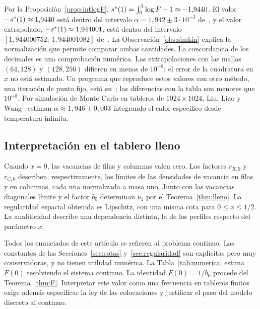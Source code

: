 Por la Proposición~\ref{prop:intlogF}, $s^{*}(1)=\int_0^1\log F-1\approx-1{,}9440$. El valor
$-s^{*}(1)\approx1{,}9440$ está dentro del intervalo $\alpha=1{,}942\pm3\cdot10^{-3}$
de~\cite{Simkin}, y el valor extrapolado, $-s^{*}(1)\approx1{,}944001$, está dentro del intervalo
$[1{,}944000752;\,1{,}944001082]$ de~\cite{NAB}. La Observación~\ref{obs:simkin} explica la normalización que permite comparar ambas
cantidades. La concordancia de los decimales es una comprobación numérica. Las extrapolaciones con las mallas $(64,128)$ y $(128,256)$ difieren en menos de
$10^{-8}$; el error de la cuadratura en $x$ no está estimado.
\ifx\DOIcodigo\empty\else
Un programa que reproduce estos valores con otro método, una iteración de punto fijo, está
en~\cite{Codigo}; las diferencias con la tabla son menores que $10^{-8}$.
\fi
Por simulación de Monte Carlo en tableros de $1024\times1024$, Liu, Liao y Wang~\cite{LLW} estiman
$\alpha\approx1{,}946\pm0{,}003$ integrando el calor específico desde temperatura infinita.

\subsection{Interpretación en el tablero lleno}

Cuando $x=0$, las vacancias de filas y columnas valen cero. Los factores
$r_{R,0}$ y $r_{C,0}$ describen, respectivamente, los límites de las densidades de vacancia
en filas y en columnas, cada una normalizada a masa uno. Junto con las vacancias diagonales
límite y el factor $b_0$ determinan $\nu_1$ por el
Teorema~\ref{thm:lleno}. La regularidad espacial obtenida es Lipschitz, con una misma
cota para $0\le x\le 1/2$. La analiticidad describe una dependencia distinta,
la de los perfiles respecto del parámetro $x$.

Todos los enunciados de este artículo se refieren al problema continuo. Las constantes de las
Secciones~\ref{sec:cotas} y~\ref{sec:regularidad} son explícitas pero muy conservadoras, y no
tienen utilidad numérica. La Tabla~\ref{tab:numerica} estima $F(0)$ resolviendo el sistema continuo.
La identidad $F(0)=1/b_0$ procede del Teorema~\ref{thm:F}. Interpretar este valor
como una frecuencia en tableros finitos exige además especificar la ley de las
colocaciones y justificar el paso del modelo discreto al continuo.
